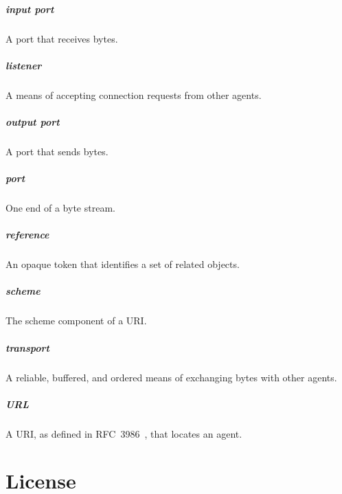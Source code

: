 \documentclass[letterpaper,12pt,openany]{report}
\newcommand{\GlossaryItem}[2]{
  \paragraph{#1} #2\vspace{-1ex}
}
\begin{document}
\GlossaryItem{input port}{A port that receives bytes.}

\GlossaryItem{listener}{A means of accepting connection requests from other
  agents.}

\GlossaryItem{output port}{A port that sends bytes.}

\GlossaryItem{port}{One end of a byte stream.}

\GlossaryItem{reference}{An opaque token that identifies a set of related
  objects.}

\GlossaryItem{scheme}{The scheme component of a URI.}

\GlossaryItem{transport}{A reliable, buffered, and ordered means of exchanging
  bytes with other agents.}

\GlossaryItem{URL}{A URI, as defined in RFC~3986~\cite{berners2014rfc}, that
  locates an agent.}



 
\label{cha:references}

\chapter{License}
\label{cha:license}

\end{document}
